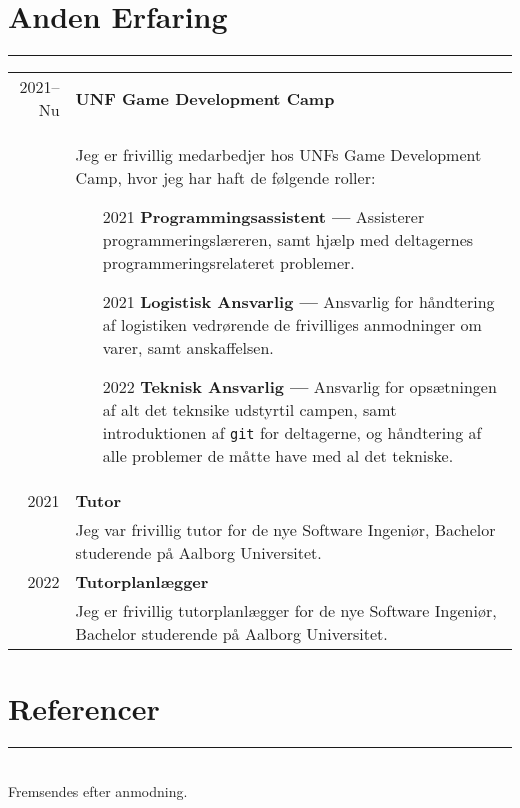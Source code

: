 \documentclass{article}
\begin{document}
\section*{Anden Erfaring}
\hrule width5cm
\begin{longtabu} to \textwidth {r|X}
2021--Nu & \textbf{UNF Game Development Camp}\\
&   Jeg er frivillig medarbedjer hos UNFs Game Development Camp, hvor jeg har haft de følgende roller:
    \begin{itemize}\setlength\itemsep{0em}
        \item[2021] \textbf{Programmingsassistent ---} Assisterer programmeringslæreren, samt
            hjælp med deltagernes programmeringsrelateret problemer.
        \item[2021] \textbf{Logistisk Ansvarlig ---} Ansvarlig for håndtering af logistiken
            vedrørende de frivilliges anmodninger om varer, samt anskaffelsen.
        \item[2022] \textbf{Teknisk Ansvarlig ---} Ansvarlig for opsætningen af alt det teknsike
            udstyrtil campen, samt introduktionen af \texttt{git} for deltagerne, og håndtering
            af alle problemer de måtte have med al det tekniske.
    \end{itemize}\\
2021 & \textbf{Tutor}\\
&   Jeg var frivillig tutor for de nye Software Ingeniør, Bachelor studerende på Aalborg Universitet.\\
2022 & \textbf{Tutorplanlægger}\\
&   Jeg er frivillig tutorplanlægger for de nye Software Ingeniør, Bachelor studerende på Aalborg Universitet.
\end{longtabu}

\section*{Referencer}
\hrule width5cm \ \\
Fremsendes efter anmodning.
\end{document}
